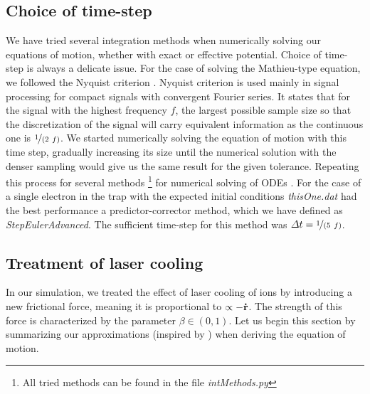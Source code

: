 \subsection{Choice of time-step}

We have tried several integration methods when numerically solving our equations of motion, whether with exact or effective potential.
Choice of time-step is always a delicate issue. For the case of solving the Mathieu-type equation, we followed the Nyquist criterion . Nyquist criterion is used mainly in signal processing for compact signals with convergent Fourier series. It states that for the signal with the highest frequency $f$, the largest possible sample size so that the discretization of the signal will carry equivalent information as the continuous one is $\nicefrac{1}{(2 \ f)}$. We started numerically solving the equation of motion with this time step, gradually increasing its size until the numerical solution with the denser sampling would give us the same result for the given tolerance. Repeating this process for several methods \footnote{All tried methods can be found in the file \textit{intMethods.py}} for numerical solving of ODEs \cite{teukolsky1992numerical}. For the case of a single electron in the trap with the expected initial conditions \textit{thisOne.dat} had the best performance a predictor-corrector method, which we have defined as \textit{StepEulerAdvanced}. The sufficient time-step for this method was $\Delta t = \nicefrac{1}{(5 \ f)}$. 


\subsection{Treatment of laser cooling}
In our simulation, we treated the effect of laser cooling of ions by introducing a new frictional force, meaning it is proportional to $\propto - \vb{\dot{r}}$. The strength of this force is characterized by the parameter $\beta \in (0,1)$. 
Let us begin this section by summarizing our approximations (inspired by \cite{Friedman_1982}) when deriving the equation of motion. 

